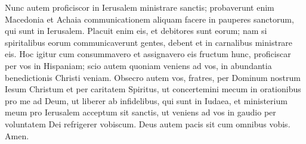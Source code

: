 \begin{biblechapter}
\verse Nunc autem proficiscor in Ierusalem ministrare sanctis; 
\verse probaverunt enim Macedonia et Achaia communicationem aliquam facere in pauperes sanctorum, qui sunt in Ierusalem. 
\verse Placuit enim eis, et debitores sunt eorum; nam si spiritalibus eorum communicaverunt gentes, debent et in carnalibus ministrare eis. 
\verse Hoc igitur cum consummavero et assignavero eis fructum hunc, proficiscar per vos in Hispaniam; 
\verse scio autem quoniam veniens ad vos, in abundantia benedictionis Christi veniam. 
\verse Obsecro autem vos, fratres, per Dominum nostrum Iesum Christum et per caritatem Spiritus, ut concertemini mecum in orationibus pro me ad Deum, 
\verse ut liberer ab infidelibus, qui sunt in Iudaea, et ministerium meum pro Ierusalem acceptum sit sanctis, 
\verse ut veniens ad vos in gaudio per voluntatem Dei refrigerer vobiscum. 
\verse Deus autem pacis sit cum omnibus vobis. Amen. 
\end{biblechapter}

